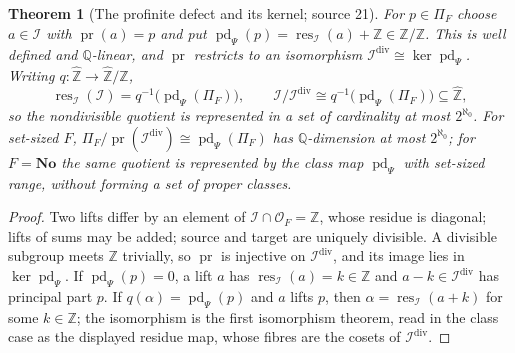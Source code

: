 \documentclass[11pt,letterpaper]{article}
\numberwithin{equation}{section}
\newtheorem{theorem}{Theorem}[section]
\theoremstyle{definition}
\theoremstyle{remark}
\newcommand{\No}{\mathbf{No}}
\newcommand{\Q}{\mathbb Q}
\newcommand{\Z}{\mathbb Z}
\newcommand{\OO}{\mathcal O}
\newcommand{\pr}{\operatorname{pr}}
\newcommand{\res}{\operatorname{res}}
\newcommand{\pd}{\operatorname{pd}}
\newcommand{\Zhat}{\widehat{\Z}}
\newcommand{\cI}{\mathcal I}
\begin{document}
\begin{theorem}[The profinite defect and its kernel; source 21]\label{trigonometry:per:thm:defect}
For $p\in\Pi_F$ choose $a\in\cI$ with $\pr(a)=p$ and put $\pd_\Psi(p)=\res_{\cI}(a)+\Z\in\Zhat/\Z$.
This is well defined and $\Q$-linear, and $\pr$ restricts to an isomorphism
$\cI^{\mathrm{div}}\cong\ker\pd_\Psi$. Writing $q:\Zhat\to\Zhat/\Z$,
\[
 \res_{\cI}(\cI)=q^{-1}\bigl(\pd_\Psi(\Pi_F)\bigr),\qquad
 \cI/\cI^{\mathrm{div}}\cong q^{-1}\bigl(\pd_\Psi(\Pi_F)\bigr)\subseteq\Zhat,
\]
so the nondivisible quotient is represented in a set of cardinality at most $2^{\aleph_0}$. For
set-sized $F$, $\Pi_F/\pr(\cI^{\mathrm{div}})\cong\pd_\Psi(\Pi_F)$ has $\Q$-dimension at most
$2^{\aleph_0}$; for $F=\No$ the same quotient is represented by the class map $\pd_\Psi$ with set-sized
range, without forming a set of proper classes.
\end{theorem}
\begin{proof}
Two lifts differ by an element of $\cI\cap\OO_F=\Z$, whose residue is diagonal; lifts of sums may be
added; source and target are uniquely divisible. A divisible subgroup meets $\Z$ trivially, so $\pr$
is injective on $\cI^{\mathrm{div}}$, and its image lies in $\ker\pd_\Psi$. If $\pd_\Psi(p)=0$, a lift
$a$ has $\res_{\cI}(a)=k\in\Z$ and $a-k\in\cI^{\mathrm{div}}$ has principal part $p$. If
$q(\alpha)=\pd_\Psi(p)$ and $a$ lifts $p$, then $\alpha=\res_{\cI}(a+k)$ for some $k\in\Z$; the
isomorphism is the first isomorphism theorem, read in the class case as the displayed residue map,
whose fibres are the cosets of $\cI^{\mathrm{div}}$.
\end{proof}
\end{document}
